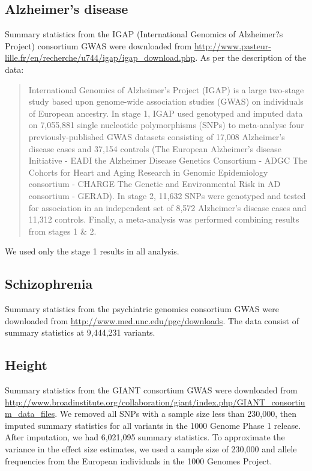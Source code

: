 \documentclass[11pt,titlepage]{article}
\begin{document}
\subsection{Alzheimer's disease}
Summary statistics from the IGAP (International Genomics of Alzheimer?s Project) consortium GWAS \citep{Lambert:2013aa} were downloaded from \url{http://www.pasteur-lille.fr/en/recherche/u744/igap/igap_download.php}. As per the description of the data:

\begin{quote}
International Genomics of Alzheimer's Project (IGAP) is a large two-stage study based upon genome-wide association studies (GWAS) on individuals of European ancestry. In stage 1, IGAP used genotyped and imputed data on 7,055,881 single nucleotide polymorphisms (SNPs) to meta-analyse four previously-published GWAS datasets consisting of 17,008 Alzheimer's disease cases and 37,154 controls (The European Alzheimer's disease Initiative - EADI the Alzheimer Disease Genetics Consortium - ADGC The Cohorts for Heart and Aging Research in Genomic Epidemiology consortium - CHARGE The Genetic and Environmental Risk in AD consortium - GERAD). In stage 2, 11,632 SNPs were genotyped and tested for association in an independent set of 8,572 Alzheimer's disease cases and 11,312 controls. Finally, a meta-analysis was performed combining results from stages 1 \& 2.
\end{quote}

We used only the stage 1 results in all analysis. 

\subsection{Schizophrenia}
Summary statistics from the psychiatric genomics consortium GWAS \citep{Schizophrenia-Working-Group-of-the-Psychiatric-Genomics-Consortium:2014aa} were downloaded from \url{http://www.med.unc.edu/pgc/downloads}. The data consist of summary statistics at 9,444,231 variants.

\subsection{Height}
Summary statistics from the GIANT consortium GWAS \citep{Wood:2014aa} were downloaded from \url{http://www.broadinstitute.org/collaboration/giant/index.php/GIANT_consortium_data_files}. We removed all SNPs with a sample size less than 230,000, then imputed summary statistics for all variants in the 1000 Genome Phase 1 release. After imputation, we had 6,021,095 summary statistics. To approximate the variance in the effect size estimates, we used a sample size of 230,000 and allele frequencies from the European individuals in the 1000 Genomes Project.
\end{document}
